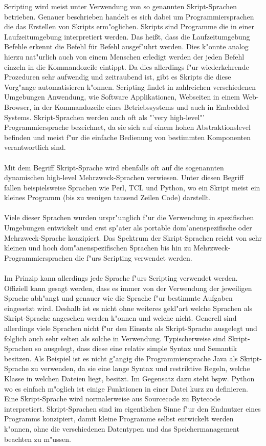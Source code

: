\documentclass[a4paper,12pt]{scrreprt}
\begin{document}
Scripting wird meist unter Verwendung von so genannten Skript-Sprachen betrieben. Genauer beschrieben handelt es sich dabei um Programmiersprachen die das Erstellen von Skripts erm"oglichen. Skripts sind Programme die in einer Laufzeitumgebung interpretiert werden. Das heißt, dass die Laufzeitumgebung Befehle erkennt die Befehl für Befehl ausgef"uhrt werden.  Dies k"onnte analog hierzu nat"urlich auch von einem Menschen erledigt werden der jeden Befehl einzeln in die Kommandozeile eintippt. Da dies allerdings f"ur wiederkehrende Prozeduren sehr aufwendig und zeitraubend ist, gibt es Skripts die diese Vorg"ange automatisieren k"onnen. Scripting findet in zahlreichen verschiedenen Umgebungen Anwendung, wie Software Applikationen, Webseiten in einem Web-Browser, in der Kommandozeile eines Betriebssystems und auch in Embedded Systems. Skript-Sprachen werden auch oft als "'very high-level"' Programmiersprache bezeichnet, da sie sich auf einem hohen Abstraktionslevel befinden und meist f"ur die einfache Bedienung von bestimmten Komponenten verantwortlich sind.\\\\Mit dem Begriff Skript-Sprache wird ebenfalls oft auf die sogenannten dynamischen high-level Mehrzweck-Sprachen verwiesen. Unter diesen Begriff fallen beispielsweise Sprachen wie Perl, TCL und Python, wo ein Skript meist ein kleines Programm (bis zu wenigen tausend Zeilen Code) darstellt.\\\\Viele dieser Sprachen wurden urspr"unglich f"ur die Verwendung in spezifischen Umgebungen entwickelt und erst sp"ater als portable dom"anenspezifische oder Mehrzweck-Sprache konzipiert. Das Spektrum der Skript-Sprachen reicht von sehr kleinen und hoch dom"anenspezifischen Sprachen bis hin zu Mehrzweck-Programmiersprachen die f"urs Scripting verwendet werden.\\\\ Im Prinzip kann allerdings jede Sprache f"urs Scripting verwendet werden. Offiziell kann gesagt werden, dass es immer von der Verwendung der jeweiligen Sprache abh"angt und genauer wie die Sprache f"ur bestimmte Aufgaben eingesetzt wird. Deshalb ist es nicht ohne weiteres gekl"art welche Sprachen als Skript-Sprache angesehen werden k"onnen und welche nicht. Generell sind allerdings viele Sprachen nicht f"ur den Einsatz als Skript-Sprache ausgelegt und folglich auch sehr selten als solche in Verwendung. Typischerweise sind Skript-Sprachen so ausgelegt, dass diese eine relativ simple Syntax und Semantik besitzen. Als Beispiel ist es nicht g"angig die Programmiersprache Java als Skript-Sprache zu verwenden, da sie eine lange Syntax und restriktive Regeln, welche Klasse in welchen Dateien liegt, besitzt. Im Gegensatz dazu steht bspw. Python wo es einfach m"oglich ist einige Funktionen in einer Datei kurz zu definieren. Eine Skript-Sprache wird normalerweise aus Sourcecode zu Bytecode interpretiert. Skript-Sprachen sind im eigentlichen Sinne f"ur den Endnutzer eines Programms konzipiert, damit kleine Programme selbst entwickelt werden k"onnen, ohne die verschiedenen Datentypen und das Speichermanagement beachten zu m"ussen.
\cite{scrip1} 
\end{document}
